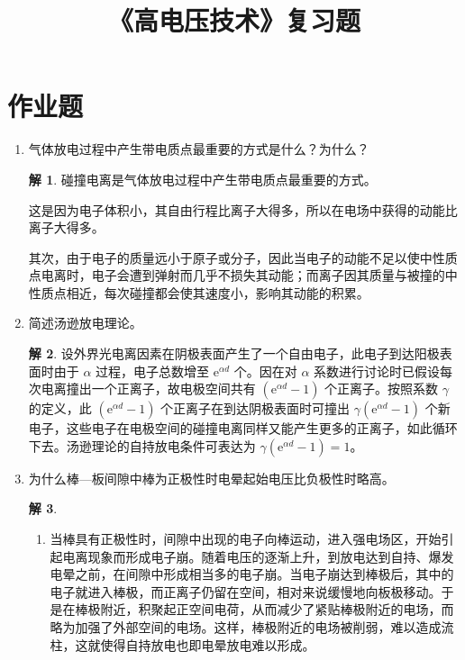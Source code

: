 \documentclass[zihao=-4,fontset = none]{ctexart}
\title{《高电压技术》复习题}
\theoremstyle{definition}
\newtheorem*{solution}{解}
\def\ee{\mathrm{e}}
\begin{document}
\maketitle
\tableofcontents
\section{作业题}
\begin{enumerate}
  \item 气体放电过程中产生带电质点最重要的方式是什么？为什么？
  \begin{solution}
    碰撞电离是气体放电过程中产生带电质点最重要的方式。

    这是因为电子体积小，其自由行程比离子大得多，所以在电场中获得的动能比离子大得多。
    
    其次，由于电子的质量远小于原子或分子，因此当电子的动能不足以使中性质点电离时，电子会遭到弹射而几乎不损失其动能；而离子因其质量与被撞的中性质点相近，每次碰撞都会使其速度小，影响其动能的积累。
  \end{solution}
  \item 简述汤逊放电理论。
  \begin{solution}
    设外界光电离因素在阴极表面产生了一个自由电子，此电子到达阳极表面时由于 $\alpha$ 过程，电子总数增至 $\ee^{αd}$ 个。因在对 $\alpha$ 系数进行讨论时已假设每次电离撞出一个正离子，故电极空间共有 $(\ee^{αd}-1)$ 个正离子。按照系数 $\gamma$ 的定义，此 $(\ee^{αd}-1)$ 个正离子在到达阴极表面时可撞出 $\gamma(\ee^{αd}-1)$ 个新电子，这些电子在电极空间的碰撞电离同样又能产生更多的正离子，如此循环下去。汤逊理论的自持放电条件可表达为 $\gamma(\ee^{αd}-1)=1$。
  \end{solution}
  \item 为什么棒—板间隙中棒为正极性时电晕起始电压比负极性时略高。
  \begin{solution}
    \begin{enumerate}
      \item 当棒具有正极性时，间隙中出现的电子向棒运动，进入强电场区，开始引起电离现象而形成电子崩。随着电压的逐渐上升，到放电达到自持、爆发电晕之前，在间隙中形成相当多的电子崩。当电子崩达到棒极后，其中的电子就进入棒极，而正离子仍留在空间，相对来说缓慢地向板极移动。于是在棒极附近，积聚起正空间电荷，从而减少了紧贴棒极附近的电场，而略为加强了外部空间的电场。这样，棒极附近的电场被削弱，难以造成流柱，这就使得自持放电也即电晕放电难以形成。 

\end{enumerate}
\end{solution}
\end{enumerate}
\end{document}
